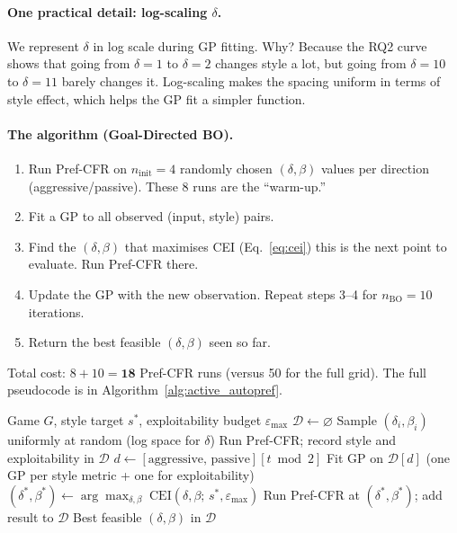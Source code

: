 \documentclass{article}
\begin{document}
\paragraph{One practical detail: log-scaling $\delta$.}
We represent $\delta$ in log scale during GP fitting.  Why?  Because the RQ2
curve shows that going from $\delta=1$ to $\delta=2$ changes style a lot, but
going from $\delta=10$ to $\delta=11$ barely changes it.  Log-scaling makes
the spacing uniform in terms of style effect, which helps the GP fit a simpler
function.

\paragraph{The algorithm (Goal-Directed BO).}
\begin{enumerate}
  \item Run Pref-CFR on $n_{\text{init}}=4$ randomly chosen
    $(\delta,\beta)$ values per direction (aggressive/passive).  These 8 runs
    are the ``warm-up.''
  \item Fit a GP to all observed (input, style) pairs.
  \item Find the $(\delta, \beta)$ that maximises CEI (Eq.~\ref{eq:cei}) this
    is the next point to evaluate.  Run Pref-CFR there.
  \item Update the GP with the new observation.  Repeat steps 3--4 for
    $n_{\text{BO}}=10$ iterations.
  \item Return the best feasible $(\delta, \beta)$ seen so far.
\end{enumerate}
Total cost: $8 + 10 = \mathbf{18}$ Pref-CFR runs (versus 50 for the full
grid).  The full pseudocode is in Algorithm~\ref{alg:active_autopref}.

\begin{algorithm}[t]
\caption{Active \textsc{AutoPref}: Goal-Directed Bayesian Search}
\label{alg:active_autopref}
\begin{algorithmic}[1]
  \REQUIRE Game $G$, style target $s^*$, exploitability budget $\varepsilon_{\max}$
  \STATE $\mathcal{D} \leftarrow \varnothing$
      \STATE Sample $(\delta_i, \beta_i)$ uniformly at random (log space for $\delta$)
      \STATE Run Pref-CFR; record style and exploitability in $\mathcal{D}$
    \ENDFOR
  \ENDFOR
    \STATE $d \leftarrow [\text{aggressive, passive}][t \bmod 2]$
    \STATE Fit GP on $\mathcal{D}[d]$ (one GP per style metric + one for exploitability)
    \STATE $(\delta^*, \beta^*) \leftarrow \arg\max_{\delta,\beta}\;\mathrm{CEI}(\delta,\beta;\,s^*,\varepsilon_{\max})$
    \STATE Run Pref-CFR at $(\delta^*, \beta^*)$; add result to $\mathcal{D}$
  \ENDFOR
  \RETURN Best feasible $(\delta, \beta)$ in $\mathcal{D}$
\end{algorithmic}
\end{algorithm}
\end{document}
